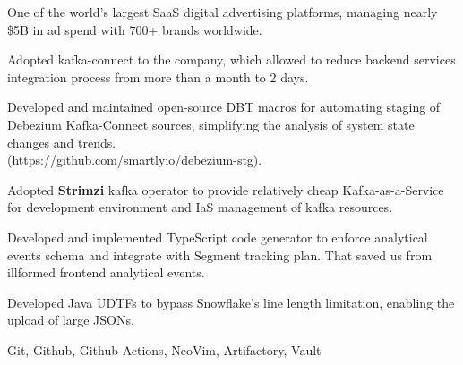  One of the world’s largest SaaS digital advertising platforms, managing
  nearly \$5B in ad spend with 700+ brands worldwide.
  \begin{gaas}
    \item Adopted kafka-connect to the company, which allowed to reduce
      backend services integration process from more than a month to 2 days.
    \item Developed and maintained open-source DBT macros for automating
      staging of Debezium Kafka-Connect sources, simplifying the analysis of
      system state changes and trends. \\
      (\href{https://github.com/smartlyio/debezium-stg}{https://github.com/smartlyio/debezium-stg}).
    \item Adopted \textbf{Strimzi} kafka operator to provide relatively
      cheap Kafka-as-a-Service for development environment and IaS
      management of kafka resources.
    \item Developed and implemented TypeScript code generator to enforce
      analytical events schema and integrate with Segment tracking plan.
      That saved us from illformed frontend analytical events.
    \item Developed Java UDTFs to bypass Snowflake's line length limitation,
      enabling the upload of large JSONs.
  \end{gaas}
  \devtools
    Git, Github, Github Actions, NeoVim, Artifactory, Vault

